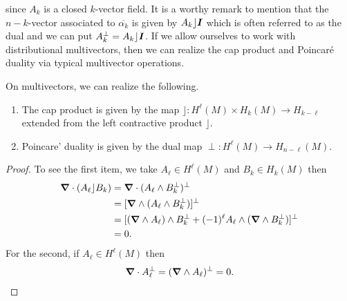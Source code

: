 \documentclass[conf]{new-aiaa}
\begin{document}
since $A_k$ is a closed $k$-vector field. It is a worthy remark to mention that the $n-k$-vector associated to $\overline{\alpha_k}$ is given by $A_k \rfloor \boldsymbol{I}$ which is often referred to as the dual and we can put $A_k^\perp = A_k \rfloor \boldsymbol{I}$. If we allow ourselves to work with distributional multivectors, then we can realize the cap product and Poincar\'e duality via typical multivector operations.
\begin{proposition}
On multivectors, we can realize the following.
\begin{enumerate}
    \item The cap product is given by the map $\rfloor \colon H^\ell(M)\times H_{k}(M) \to H_{k-\ell}$ extended from the left contractive product $\rfloor$.
    \item Poincare' duality is given by the dual map $\perp \colon H^\ell(M) \to H_{n-\ell}(M)$.
\end{enumerate}
\end{proposition}
\begin{proof}
To see the first item, we take $A_\ell\in H^\ell(M)$ and $B_k \in H_k(M)$ then
\begin{align}
    \boldsymbol{\nabla} \cdot (A_\ell \rfloor B_k) &= \boldsymbol{\nabla} \cdot (A_\ell \wedge B_k^\perp)^\perp\\
    &= [\boldsymbol{\nabla} \wedge (A_\ell \wedge B_k^\perp)]^\perp\\
    &= [(\boldsymbol{\nabla} \wedge A_\ell)\wedge B_k^\perp +(-1)^\ell A_\ell \wedge (\boldsymbol{\nabla} \wedge B_k^\perp)]^\perp\\
    &= 0.
\end{align}
For the second, if $A_{\ell}\in H^\ell(M)$ then
\begin{align}
    \boldsymbol{\nabla} \cdot A_\ell^\perp = (\boldsymbol{\nabla} \wedge A_\ell)^\perp = 0.
\end{align}
\end{proof}
\end{document}
